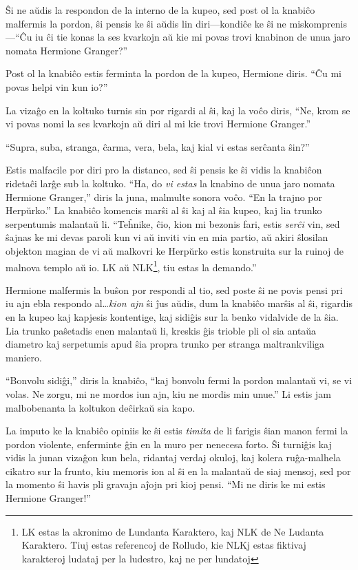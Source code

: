 Ŝi ne aŭdis la respondon de la interno de la kupeo, sed post ol la
knabiĉo malfermis la pordon, ŝi pensis ke ŝi aŭdis lin diri—kondiĉe ke
ŝi ne miskomprenis—``Ĉu iu ĉi tie konas la ses kvarkojn aŭ kie mi povas
trovi knabinon de unua jaro nomata Hermione Granger?''

Post ol la knabiĉo estis ferminta la pordon de la kupeo, Hermione
diris. ``Ĉu mi povas helpi vin kun io?''

La vizaĝo en la koltuko turnis sin por rigardi al ŝi, kaj la voĉo
diris, ``Ne, krom se vi povas nomi la ses kvarkojn aŭ diri al mi kie
trovi Hermione Granger.''

``Supra, suba, stranga, ĉarma, vera, bela, kaj kial vi estas serĉanta
ŝin?''

Estis malfacile por diri pro la distanco, sed ŝi pensis ke ŝi vidis la
knabiĉon ridetaĉi larĝe sub la koltuko. ``Ha, do \emph{vi estas} la
knabino de unua jaro nomata Hermione Granger,'' diris la juna,
malmulte sonora voĉo. ``En la trajno por Herpŭrko.'' La knabiĉo
komencis marŝi al ŝi kaj al ŝia kupeo, kaj lia trunko serpentumis
malantaŭ li. ``Teĥnike, ĉio, kion mi bezonis fari, estis \emph{serĉi}
vin, sed ŝajnas ke mi devas paroli kun vi aŭ inviti vin en mia partio,
aŭ akiri ŝlosilan objekton magian de vi aŭ malkovri ke Herpŭrko estis
konstruita sur la ruinoj de malnova templo aŭ io. LK aŭ
NLK\footnote{LK estas la akronimo de Lundanta Karaktero, kaj NLK de Ne
  Ludanta Karaktero. Tiuj estas referencoj de Rolludo, kie NLKj estas
  fiktivaj karakteroj ludataj per la ludestro, kaj ne per lundatoj},
tiu estas la demando.''

Hermione malfermis la buŝon por respondi al tio, sed poste ŝi ne povis
pensi pri iu ajn ebla respondo al\ldots \emph{kion ajn} ŝi ĵus aŭdis,
dum la knabiĉo marŝis al ŝi, rigardis en la kupeo kaj kapjesis
kontentige, kaj sidiĝis sur la benko vidalvide de la ŝia. Lia trunko
paŝetadis enen malantaŭ li, kreskis ĝis trioble pli ol sia antaŭa
diametro kaj serpetumis apud ŝia propra trunko per stranga
maltrankviliga maniero.

``Bonvolu sidiĝi,'' diris la knabiĉo, ``kaj bonvolu fermi la pordon
malantaŭ vi, se vi volas. Ne zorgu, mi ne mordos iun ajn, kiu ne
mordis min unue.'' Li estis jam malbobenanta la koltukon deĉirkaŭ sia
kapo.

La imputo ke la knabiĉo opiniis ke ŝi estis \emph{timita} de li farigis
ŝian manon fermi la pordon violente, enferminte ĝin en la muro per
nenecesa forto. Ŝi turniĝis kaj vidis la junan vizaĝon kun hela,
ridantaj verdaj okuloj, kaj kolera ruĝa-malhela cikatro sur la frunto,
kiu memoris ion al ŝi en la malantaŭ de siaj mensoj, sed por la
momento ŝi havis pli gravajn aĵojn pri kioj pensi. ``Mi ne diris ke mi
estis Hermione Granger!''

